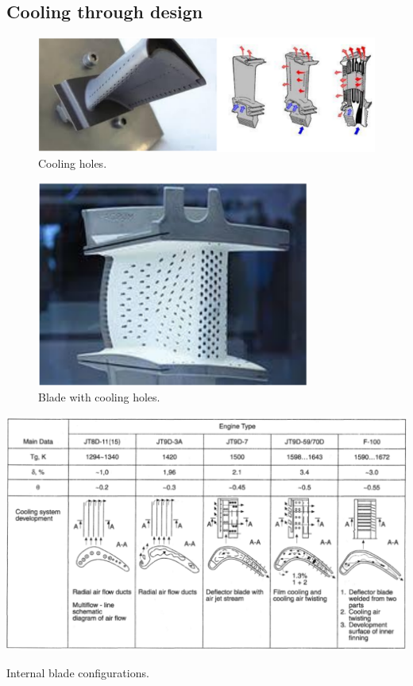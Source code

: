 \subsection{Cooling through design}
\begin{figure}[H]
    \centering
    \includegraphics[width =\textwidth]{img/figure32.png}
    \caption{Cooling holes.}
\end{figure}
\begin{figure}[H]
    \centering
    \includegraphics[width =0.8\textwidth]{img/figure33.png}
    \caption{Blade with cooling holes.}
\end{figure}
\begin{table}[H]
    \centering
    \includegraphics[width =\textwidth]{img/figure34.png}
    \caption{Internal blade configurations.}
\end{table}
